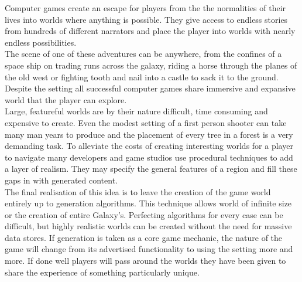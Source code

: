 Computer games create an escape for players from the the normalities of their
lives into worlds where anything is possible. They give access to endless stories
from hundreds of different narrators and place the player into worlds with nearly
endless possibilities.\\

The scene of one of these adventures can be anywhere, from the confines of a 
space ship on trading runs across the galaxy, riding a horse through the planes
of the old west or fighting tooth and nail into a castle to sack it to the 
ground. Despite the setting all successful computer games share immersive and 
expansive world that the player can explore. \\

Large, featureful worlds are by their nature difficult, time consuming and 
expensive to create. Even the modest setting of a first person shooter can take
many man years to produce and the placement of every tree in a forest is a very
demanding task. To alleviate the costs of creating interesting worlds for a 
player to navigate many developers and game studios use procedural techniques to
add a layer of realism. They may specify the general features of a region and 
fill these gaps in with generated content.\\

The final realisation of this idea is to leave the creation of the game world 
entirely up to generation algorithms. This technique allows world of infinite size
or the creation of entire Galaxy's. Perfecting algorithms for every case can be 
difficult, but highly realistic worlds can be created without the need for 
massive data stores. If generation is taken as a core game mechanic, the nature
of the game will change from its advertised functionality to using the setting 
more and more. If done well players will pass around the worlds they have been
given to share the experience of something particularly unique.\\
